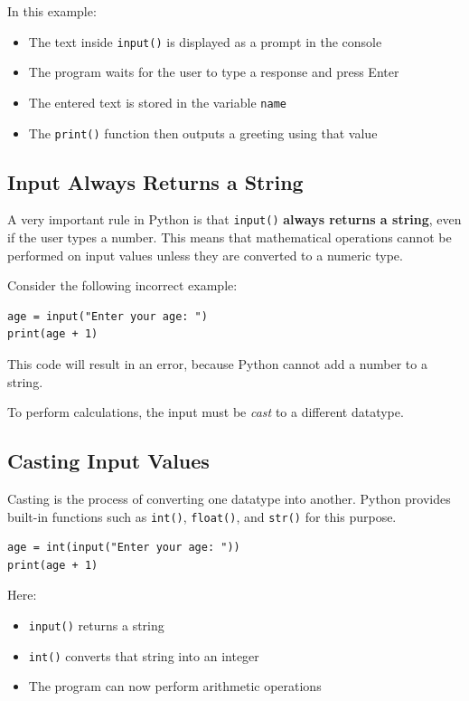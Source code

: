 In this example:
\begin{itemize}
    \item The text inside \texttt{input()} is displayed as a prompt in the console
    \item The program waits for the user to type a response and press Enter
    \item The entered text is stored in the variable \texttt{name}
    \item The \texttt{print()} function then outputs a greeting using that value
\end{itemize}

\subsection{Input Always Returns a String}

A very important rule in Python is that \texttt{input()} \textbf{always returns a
string}, even if the user types a number. This means that mathematical operations
cannot be performed on input values unless they are converted to a numeric type.

Consider the following incorrect example:

\begin{verbatim}
age = input("Enter your age: ")
print(age + 1)
\end{verbatim}

This code will result in an error, because Python cannot add a number to a string.

To perform calculations, the input must be \emph{cast} to a different datatype.

\subsection{Casting Input Values}
Casting is the process of converting one datatype into another. Python provides
built-in functions such as \texttt{int()}, \texttt{float()}, and \texttt{str()} for
this purpose.

\begin{verbatim}
age = int(input("Enter your age: "))
print(age + 1)
\end{verbatim}

Here:
\begin{itemize}
    \item \texttt{input()} returns a string
    \item \texttt{int()} converts that string into an integer
    \item The program can now perform arithmetic operations
\end{itemize}

